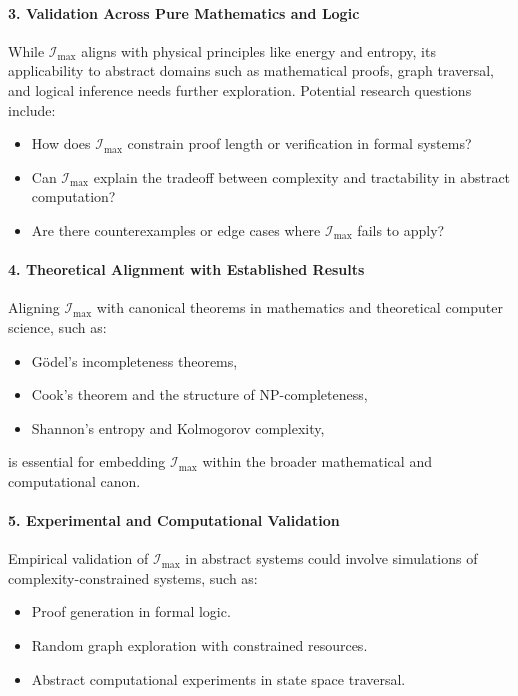\documentclass[12pt]{article}
\begin{document}
\paragraph{3. Validation Across Pure Mathematics and Logic}
While \(\mathcal{I}_{\text{max}}\) aligns with physical principles like energy and entropy, its applicability to abstract domains such as mathematical proofs, graph traversal, and logical inference needs further exploration. Potential research questions include:
\begin{itemize}
    \item How does \(\mathcal{I}_{\text{max}}\) constrain proof length or verification in formal systems?
    \item Can \(\mathcal{I}_{\text{max}}\) explain the tradeoff between complexity and tractability in abstract computation?
    \item Are there counterexamples or edge cases where \(\mathcal{I}_{\text{max}}\) fails to apply?
\end{itemize}

\paragraph{4. Theoretical Alignment with Established Results}
Aligning \(\mathcal{I}_{\text{max}}\) with canonical theorems in mathematics and theoretical computer science, such as:
\begin{itemize}
    \item Gödel’s incompleteness theorems,
    \item Cook’s theorem and the structure of NP-completeness,
    \item Shannon’s entropy and Kolmogorov complexity,
\end{itemize}
is essential for embedding \(\mathcal{I}_{\text{max}}\) within the broader mathematical and computational canon.

\paragraph{5. Experimental and Computational Validation}
Empirical validation of \(\mathcal{I}_{\text{max}}\) in abstract systems could involve simulations of complexity-constrained systems, such as:
\begin{itemize}
    \item Proof generation in formal logic.
    \item Random graph exploration with constrained resources.
    \item Abstract computational experiments in state space traversal.
\end{itemize}
\end{document}
